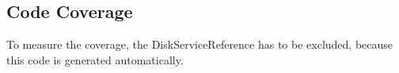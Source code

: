 \documentclass[JCDReport.tex]{subfiles}
\begin{document}
\subsection{Code Coverage}

To measure the coverage, the DiskServiceReference has to be excluded, because this code is generated automatically.
\end{document}

